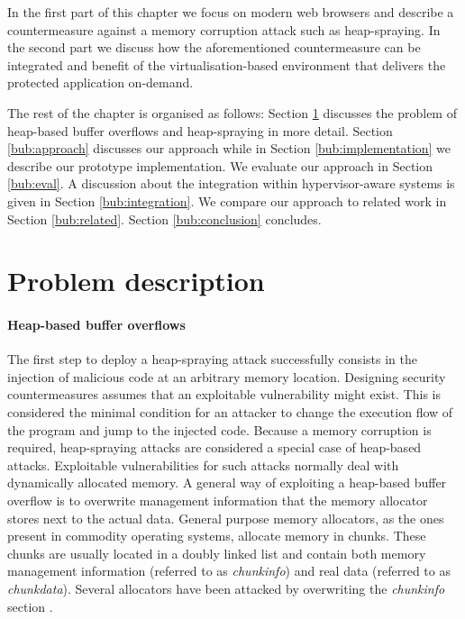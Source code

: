 In the first part of this chapter we focus on modern web browsers and describe a countermeasure against a memory corruption attack such as heap-spraying. In the second part we discuss how the aforementioned countermeasure can be integrated and benefit of the virtualisation-based environment that delivers the protected application on-demand.

The rest of the chapter is organised as follows: Section \ref{bub:problem} discusses the problem of heap-based buffer overflows and heap-spraying in more detail. Section \ref{bub:approach} discusses our approach while in Section \ref{bub:implementation} we describe our prototype implementation. We evaluate our approach in Section \ref{bub:eval}. 
A discussion about the integration within hypervisor-aware systems is given in Section \ref{bub:integration}. We compare our approach to related work in Section \ref{bub:related}. Section \ref{bub:conclusion} concludes.

\section{Problem description} \label{bub:problem}
\paragraph{Heap-based buffer overflows}
The first step to deploy a heap-spraying attack successfully consists in the injection of malicious code at an arbitrary memory location. 
Designing security countermeasures assumes that an exploitable vulnerability might exist. This is considered the minimal condition for an attacker to change the execution flow of the program and jump to the injected code.
Because a memory corruption is required, heap-spraying attacks are considered a special case of heap-based attacks. 
Exploitable vulnerabilities for such attacks normally deal with dynamically allocated memory. 
A general way of exploiting a heap-based buffer overflow is to overwrite management information that the memory allocator stores next to the actual data. General purpose memory allocators, as the ones present in commodity operating systems, allocate memory in chunks. These chunks are usually located in a doubly linked list and contain both memory management information (referred to as \textit{chunkinfo}) and real data (referred to as \textit{chunkdata}). Several allocators have been attacked by overwriting the \textit{chunkinfo} section \cite{younan2005security}. 


